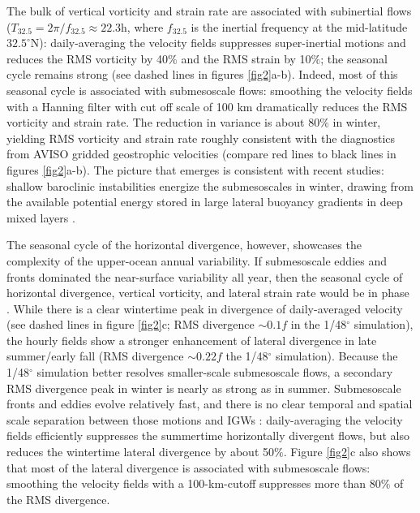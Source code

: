 \documentclass[grl]{agutex2015}
\begin{document}
\begin{article}
The bulk of vertical vorticity and strain rate are associated with subinertial flows
($T_{32.5} = 2\pi/f_{32.5}\approx 22.3$h, where $f_{32.5}$ is the inertial frequency at
the  mid-latitude $32.5^\circ$N): daily-averaging the velocity fields suppresses super-inertial
motions and reduces the RMS
vorticity by 40$\%$ and the RMS strain by 10$\%$; the seasonal
cycle remains strong (see
dashed lines in figures \ref{fig2}a-b). Indeed, most of this seasonal cycle is associated
with submesoscale flows: smoothing the velocity fields
with a Hanning filter with cut off scale of 100 km dramatically reduces the RMS
vorticity and strain rate. The reduction in variance is about 80$\%$ in winter,
yielding RMS vorticity and strain  rate roughly consistent with the diagnostics from
AVISO gridded geostrophic velocities (compare red lines to black lines in figures \ref{fig2}a-b).
The picture that emerges is consistent with recent studies: shallow baroclinic
instabilities energize the submesoscales in winter, drawing from the available
potential energy stored in large lateral buoyancy gradients in deep mixed layers \citep{sasaki_etal2014,callies_etal2015,callies_etal2016}.

The seasonal cycle of the horizontal divergence, however, showcases the complexity
of the upper-ocean annual variability. If submesoscale eddies and fronts dominated
the near-surface variability all year, then the seasonal cycle of horizontal divergence,
vertical vorticity, and lateral strain rate would be in phase \citep[e.g.,][]{sasaki_etal2014}.
While there is a clear wintertime peak in divergence of daily-averaged velocity
(see dashed lines in figure \ref{fig2}c; RMS divergence $\sim0.1 f$ in the 1/48$^\circ$
simulation), the hourly fields show
a stronger enhancement of
lateral divergence in late summer/early fall (RMS divergence $\sim0.22 f$ the 1/48$^\circ$
simulation). Because the 1/48$^\circ$ simulation better resolves
smaller-scale submesoscale flows, a secondary RMS divergence peak in winter  is
nearly as strong as in summer. Submesoscale fronts and eddies evolve
relatively fast, and there is no clear
temporal and spatial scale separation between those motions and IGWs
\citep{mcwilliams2016}:
daily-averaging the velocity fields efficiently suppresses the summertime horizontally
divergent flows, but also reduces the wintertime lateral divergence by about 50$\%$.
Figure \ref{fig2}c also shows that most of the lateral divergence is associated
with submesoscale flows: smoothing the velocity fields with a 100-km-cutoff
suppresses more than 80$\%$ of the RMS divergence.



\end{article}
\end{document}
